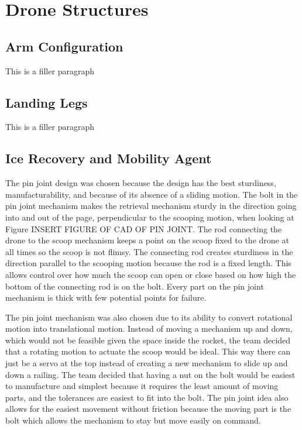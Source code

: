 	\section{Drone Structures}\label{PL:Design:Structures}
		\subsection{Arm Configuration}
			This is a filler paragraph

		\subsection{Landing Legs}
			This is a filler paragraph
	
		\subsection{Ice Recovery and Mobility Agent}
		The pin joint design was chosen because the design has the best sturdiness, manufacturability, and because of its absence of a sliding motion. The bolt in the pin joint mechanism makes the retrieval mechanism sturdy in the direction going into and out of the page, perpendicular to the scooping motion,  when looking at Figure INSERT FIGURE OF CAD OF PIN JOINT. The rod connecting the drone to the scoop mechanism keeps a point on the scoop fixed to the drone at all times so the scoop is not flimsy. The connecting rod creates sturdiness in the direction parallel to the scooping motion because the rod is a fixed length. This allows control over how much the scoop can open or close based on how high the bottom of the connecting rod is on the bolt. Every part on the pin joint mechanism is thick with few potential points for failure. 

		The pin joint mechanism was also chosen due to its ability to convert rotational motion into translational motion. Instead of moving a mechanism up and down, which would not be feasible given the space inside the rocket, the team decided that a rotating motion to actuate the scoop would be ideal. This way there can just be a servo at the top instead of creating a new mechanism to slide up and down a railing. The team decided that having a nut on the bolt would be easiest to manufacture and simplest because it requires the least amount of moving parts, and the tolerances are easiest to fit into the bolt. The pin joint idea also allows for the easiest movement without friction because the moving part is the bolt which allows the mechanism to stay but move easily on command.

